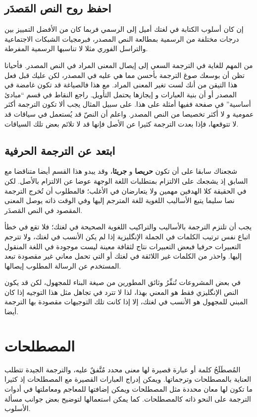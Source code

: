 \section{احفظ روح النص المَصدَر}
إن كان أسلوب الكتابة في لغتك أميل إلى الرسمي فربما كان من الأفضل التمييز
بين درجات مختلفة من الرسمية بمطالعة النص المصدر، فبرمجيات الشبكات
الاجتماعية والتراسل الفوري مثلا لا تناسبها الرسمية المفرطة.

من المهم للغاية في الترجمة السعي إلى إيصال المعنى المراد في النص المصدر.
فأحيانا تظن أن بوسعك صوغ الترجمة بأحسن مما هي عليه في المصدر، لكن عليك
قبل فعل هذا التيقن من أنك لست تغير المعنى المراد. مع هذا فالصياغة قد
تكون غامضة في المصدر أو أن بنية العبارات و إيجازها يحتمل التأويل. راجع
النقاط في قسم “مبادئ أساسية” في صفحة \at[ref:34314226] ففيها
أمثلة على هذا. على سبيل المثال يجب ألا تكون الترجمة أكثر عمومية و لا
أكثر تخصيصا من النص المصدر. واعلم أن النصّ قد يُستعمل في سياقات قد لا
تتوقعها، فإذا بعدت الترجمة كثيرا عن الأصل فإنها قد لا تلائم بعض تلك
السياقات.

\section{ابتعد عن الترجمة الحرفية}
شجعناك سابقا على أن تكون {\bf حريصا} و {\bf جريئا}، وقد يبدو هذا القسم
أيضا متناقضا مع السابق إذ يشجعك على الالتزام بمتطلبات اللغة الوجهة عوضا
عن الالتزام بالأصل. لكن في الحقيقة كلا الهدفين مهمين ولا يتعارضان في
الأغلب؛ فالمطلوب أن تُخرج الترجمة نصا سليما يتبع الأساليب اللغوية للغة
المترجم إليها وفي الوقت ذاته يوصل المعنى المقصود في النص المَصدَر.

يجب أن تلتزم الترجمة بالأساليب والتراكيب اللغوية الصحيحة في لغتك؛ فلا
تقع في خطأ اتباع نفس ترتيب الكلمات في الجملة الإنگليزية إذا لم يكن
الأنسب في لغتك، ولا تترجم التعبيرات حرفيا فبعض التعبيرات نتاج لثقافة
معينة ليست موجودة في اللغة المنقول إليها. واحذر من الكلمات غير اللائقة
في لغتك أو التي تحمل معاني غير مقصودة تبعد المستخدم عن الرسالة المطلوب
إيصالها.

في بعض المشروعات تُنفِّرُ وثائق المطورين من صيغة البناء للمجهول، لكن قد
يكون النص الإنگليزي فقط هو المعني بهذا، لذا لا تترد في تجاهل مثل هذا
التوجيه إذا كان المبني للمجهول هو الأنسب في لغتك، إلا إذا كانت تلك
التوجيهات مقصودة بها الترجمة أيضا.

\chapter{المصطلحات}
المُصطَلَحُ كلمة أو عبارة قصيرة لها معنى محدد مُتَّفقٌ عليه، والترجمة
الجيدة تتطلب العناية بالمصطلحات وترجماتها. ويمكن إدراج العبارات القصيرة
مع المصطلحات إذ كثيرا ما تكون لها معان محددة مثل المصطلحات ويمكن
إضافتها للمعاجم ومعاملتها في أدوات الترجمة على النحو ذاته كالمصطلحات.
كما يمكن استعمالها لتوضيح بعض جوانب مسألة الأسلوب.

